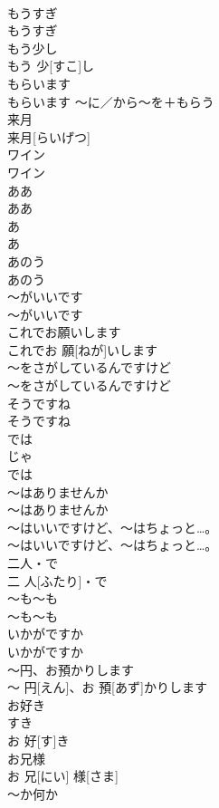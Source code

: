 \documentclass[8pt]{extreport}
\begin{document}
\begin{CJK}{UTF8}{min}
\\	もうすぎ	
\\	もうすぎ		
\\	もう少し	
\\	もう 少[すこ]し		
\\	もらいます	
\\	もらいます	〜に／から〜を＋もらう	
\\	来月	
\\	来月[らいげつ]		
\\	ワイン	
\\	ワイン		
\\	ああ	
\\	ああ		
\\	あ	
\\	あ		
\\	あのう	
\\	あのう		
\\	〜がいいです	
\\	〜がいいです		
\\	これでお願いします	
\\	これでお 願[ねが]いします		
\\	〜をさがしているんですけど	
\\	〜をさがしているんですけど		
\\	そうですね	
\\	そうですね		
\\	では	
\\	じゃ 
\\	では		
\\	〜はありませんか	
\\	〜はありませんか		
\\	〜はいいですけど、〜はちょっと…。	
\\	〜はいいですけど、〜はちょっと…。		
\\	二人・で	
\\	二 人[ふたり]・で		
\\	〜も〜も	
\\	〜も〜も		
\\	いかがですか	
\\	いかがですか		
\\	〜円、お預かりします	
\\	〜 円[えん]、お 預[あず]かりします		
\\	お好き	
\\	すき 
\\	お 好[す]き		
\\	お兄様	
\\	お 兄[にい] 様[さま]		
\\	〜か何か	

\end{CJK}
\end{document}

